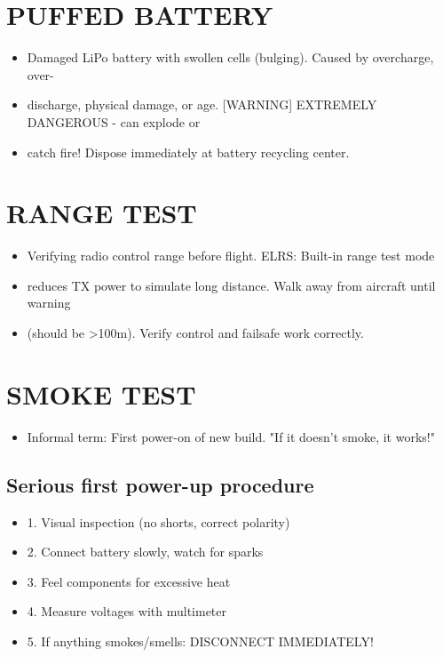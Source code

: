 \documentclass[11pt,letterpaper]{article}
\begin{document}
\section{PUFFED BATTERY}

\begin{itemize}
  \item Damaged LiPo battery with swollen cells (bulging). Caused by overcharge, over-
  \item discharge, physical damage, or age. [WARNING] EXTREMELY DANGEROUS - can explode or
  \item catch fire! Dispose immediately at battery recycling center.
\end{itemize}

\section{RANGE TEST}

\begin{itemize}
  \item Verifying radio control range before flight. ELRS: Built-in range test mode
  \item reduces TX power to simulate long distance. Walk away from aircraft until warning
  \item (should be >100m). Verify control and failsafe work correctly.
\end{itemize}

\section{SMOKE TEST}

\begin{itemize}
  \item Informal term: First power-on of new build. "If it doesn't smoke, it works!"
\end{itemize}

\subsection{Serious first power-up procedure}

\begin{itemize}
  \item 1. Visual inspection (no shorts, correct polarity)
  \item 2. Connect battery slowly, watch for sparks
  \item 3. Feel components for excessive heat
  \item 4. Measure voltages with multimeter
  \item 5. If anything smokes/smells: DISCONNECT IMMEDIATELY!
\end{itemize}
\end{document}
